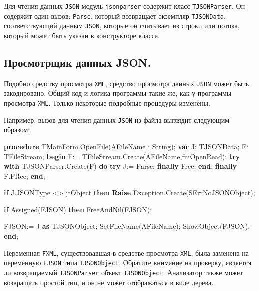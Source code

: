 \documentclass[
]{article}
\newenvironment{Shaded}{}{}
\newcommand{\DataTypeTok}[1]{\textcolor[rgb]{0.56,0.13,0.00}{#1}}
\newcommand{\KeywordTok}[1]{\textcolor[rgb]{0.00,0.44,0.13}{\textbf{#1}}}
\newcommand{\NormalTok}[1]{#1}
\begin{document}
Для чтения данных \texttt{JSON} модуль \texttt{jsonparser} содержит
класс \texttt{TJSONParser}. Он содержит один вызов: \texttt{Parse},
который возвращает экземпляр \texttt{TJSONData}, соответствующий данным
\texttt{JSON}, которые он считывает из строки или потока, который может
быть указан в конструкторе класса.

\hypertarget{header-n2580}{%
\subsection{Просмотрщик данных JSON.}\label{header-n2580}}

Подобно средству просмотра \texttt{XML}, средство просмотра данных
\texttt{JSON} может быть закодировано. Общий код и логика программы
такие же, как у программы просмотра \texttt{XML}. Только некоторые
подробные процедуры изменены.

Например, вызов для чтения данных \texttt{JSON} из файла выглядит
следующим образом:

\begin{Shaded}
\begin{Highlighting}[]
\KeywordTok{procedure}\NormalTok{ TMainForm.OpenFile(AFileName : }\DataTypeTok{String}\NormalTok{);}
\KeywordTok{var}
\NormalTok{  J: TJSONData;}
\NormalTok{  F: TFileStream;}
\KeywordTok{begin}
\NormalTok{  F:= TFileStream.Create(AFileName,fmOpenRead);}
  \KeywordTok{try}
    \KeywordTok{with}\NormalTok{ TJSONParser.Create(F) }\KeywordTok{do}
    \KeywordTok{try}
\NormalTok{      J:= Parse;}
    \KeywordTok{finally}
\NormalTok{      Free;}
    \KeywordTok{end}\NormalTok{;}
  \KeywordTok{finally}
\NormalTok{    F.FRee;}
  \KeywordTok{end}\NormalTok{;}

  \KeywordTok{if}\NormalTok{ J.JSONType \textless{}\textgreater{} jtObject }\KeywordTok{then}
    \KeywordTok{Raise}\NormalTok{ Exception.Create(SErrNoJSONObject);}

  \KeywordTok{if}\NormalTok{ Assigned(FJSON) }\KeywordTok{then}\NormalTok{ FreeAndNil(FJSON);}

\NormalTok{  FJSON:= J }\KeywordTok{as}\NormalTok{ TJSONObject;}
\NormalTok{  SetFileName(AFileName);}
\NormalTok{  ShowObject(FJSON);}
\KeywordTok{end}\NormalTok{;}
\end{Highlighting}
\end{Shaded}

Переменная \texttt{FXML}, существовавшая в средстве просмотра
\texttt{XML}, была заменена на переменную \texttt{FJSON} типа
\texttt{TJSONObject}. Обратите внимание на проверку, является ли
возвращаемый \texttt{TJSONParser} объект \texttt{TJSONObject}.
Анализатор также может возвращать простой тип, и он не может
отображаться в виде дерева.
\end{document}
